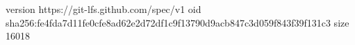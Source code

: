 version https://git-lfs.github.com/spec/v1
oid sha256:fe4fda7d11fe0cfe8ad62e2d72df1c9f13790d9acb847c3d059f843f39f131c3
size 16018
